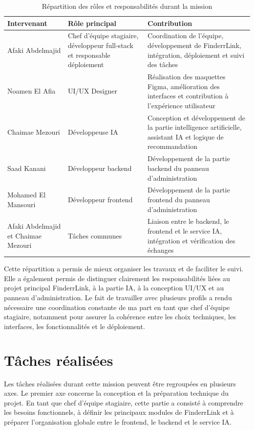 \begin{table}[H]
\centering
\small
\renewcommand{\arraystretch}{1.4}
\begin{tabular}{|p{3.5cm}|p{4cm}|p{5.5cm}|}
\hline
\textbf{Intervenant} & \textbf{Rôle principal} & \textbf{Contribution} \\
\hline
Afaki Abdelmajid & Chef d'équipe stagiaire, développeur full-stack et responsable déploiement & Coordination de l'équipe, développement de FinderrLink, intégration, déploiement et suivi des tâches \\
\hline
Noamen El Afia & UI/UX Designer & Réalisation des maquettes Figma, amélioration des interfaces et contribution à l'expérience utilisateur \\
\hline
Chaimae Mezouri & Développeuse IA & Conception et développement de la partie intelligence artificielle, assistant IA et logique de recommandation \\
\hline
Saad Kanani & Développeur backend & Développement de la partie backend du panneau d'administration \\
\hline
Mohamed El Mansouri & Développeur frontend & Développement de la partie frontend du panneau d'administration \\
\hline
Afaki Abdelmajid et Chaimae Mezouri & Tâches communes & Liaison entre le backend, le frontend et le service IA, intégration et vérification des échanges \\
\hline
\end{tabular}
\caption{Répartition des rôles et responsabilités durant la mission}
\label{tab:roles-responsabilites}
\end{table}

Cette répartition a permis de mieux organiser les travaux et de faciliter le suivi. Elle a également permis de distinguer clairement les responsabilités liées au projet principal FinderrLink, à la partie IA, à la conception UI/UX et au panneau d'administration. Le fait de travailler avec plusieurs profils a rendu nécessaire une coordination constante de ma part en tant que chef d'équipe stagiaire, notamment pour assurer la cohérence entre les choix techniques, les interfaces, les fonctionnalités et le déploiement.

\section{Tâches réalisées}

Les tâches réalisées durant cette mission peuvent être regroupées en plusieurs axes. Le premier axe concerne la conception et la préparation technique du projet. En tant que chef d'équipe stagiaire, cette partie a consisté à comprendre les besoins fonctionnels, à définir les principaux modules de FinderrLink et à préparer l'organisation globale entre le frontend, le backend et le service IA.

